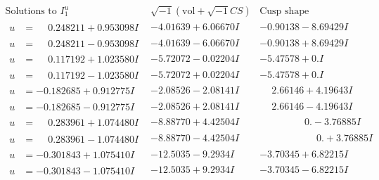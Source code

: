 \documentclass[1p]{elsarticle_modified}
\theoremstyle{definition}
\newcommand{\I}{\sqrt{-1}}
\begin{document}
$$\begin{array}{c|c|c}  
\text{Solutions to }I^u_{1}& \I (\text{vol} + \sqrt{-1}CS) & \text{Cusp shape}\\
 \hline 
\begin{aligned}
u &= \phantom{-}0.248211 + 0.953098 I\end{aligned}
 & -4.01639 + 6.06670 I & -0.90138 - 8.69429 I \\ \hline\begin{aligned}
u &= \phantom{-}0.248211 - 0.953098 I\end{aligned}
 & -4.01639 - 6.06670 I & -0.90138 + 8.69429 I \\ \hline\begin{aligned}
u &= \phantom{-}0.117192 + 1.023580 I\end{aligned}
 & -5.72072 - 0.02204 I & -5.47578 + 0. I\phantom{ +0.000000I} \\ \hline\begin{aligned}
u &= \phantom{-}0.117192 - 1.023580 I\end{aligned}
 & -5.72072 + 0.02204 I & -5.47578 + 0. I\phantom{ +0.000000I} \\ \hline\begin{aligned}
u &= -0.182685 + 0.912775 I\end{aligned}
 & -2.08526 - 2.08141 I & \phantom{-}2.66146 + 4.19643 I \\ \hline\begin{aligned}
u &= -0.182685 - 0.912775 I\end{aligned}
 & -2.08526 + 2.08141 I & \phantom{-}2.66146 - 4.19643 I \\ \hline\begin{aligned}
u &= \phantom{-}0.283961 + 1.074480 I\end{aligned}
 & -8.88770 + 4.42504 I & \phantom{-0.000000 } 0. - 3.76885 I \\ \hline\begin{aligned}
u &= \phantom{-}0.283961 - 1.074480 I\end{aligned}
 & -8.88770 - 4.42504 I & \phantom{-0.000000 -}0. + 3.76885 I \\ \hline\begin{aligned}
u &= -0.301843 + 1.075410 I\end{aligned}
 & -12.5035 - 9.2934 I & -3.70345 + 6.82215 I \\ \hline\begin{aligned}
u &= -0.301843 - 1.075410 I\end{aligned}
 & -12.5035 + 9.2934 I & -3.70345 - 6.82215 I \\ \hline\begin{aligned}

\end{aligned}
\end{array}$$
\end{document}
